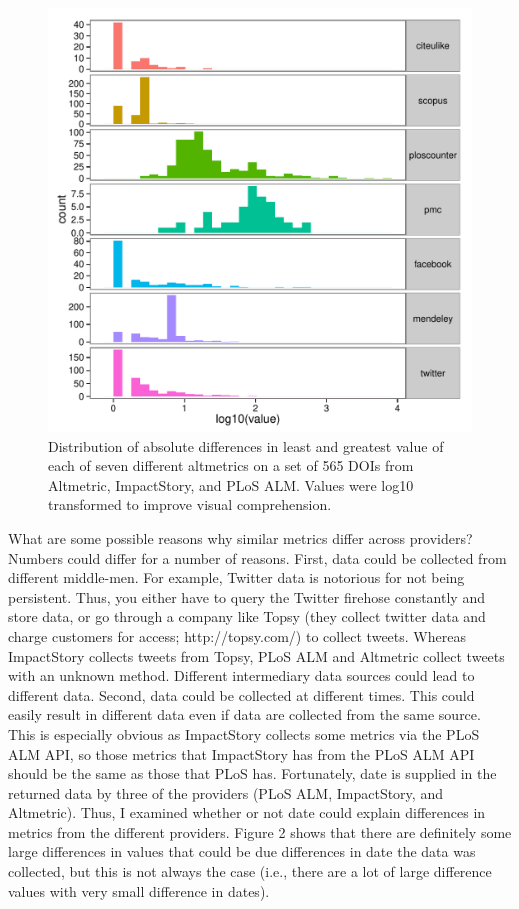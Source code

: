 \documentclass[letterpaper,superscriptaddress,showkeys,longbibliography]{revtex4-1}\usepackage{graphicx, color}
\newenvironment{knitrout}{}{} %
\begin{document}
\begin{knitrout}
\color{fgcolor}\begin{figure}[]


{\centering \includegraphics[width=.7\linewidth]{figure/dataconst_plot1} 

}

\caption[Distribution of absolute differences in least and greatest value of each of seven different altmetrics on a set of 565 DOIs from Altmetric, ImpactStory, and PLoS ALM]{Distribution of absolute differences in least and greatest value of each of seven different altmetrics on a set of 565 DOIs from Altmetric, ImpactStory, and PLoS ALM. Values were log10 transformed to improve visual comprehension.\label{fig:dataconst_plot1}}
\end{figure}


\end{knitrout}


What are some possible reasons why similar metrics differ across providers? Numbers could differ for a number of reasons. First, data could be collected from different middle-men. For example, Twitter data is notorious for not being persistent. Thus, you either have to query the Twitter firehose constantly and store data, or go through a company like Topsy (they collect twitter data and charge customers for access; http://topsy.com/) to collect tweets. Whereas ImpactStory collects tweets from Topsy, PLoS ALM and Altmetric collect tweets with an unknown method. Different intermediary data sources could lead to different data. Second, data could be collected at different times. This could easily result in different data even if data are collected from the same source. This is especially obvious as ImpactStory collects some metrics via the PLoS ALM API, so those metrics that ImpactStory has from the PLoS ALM API should be the same as those that PLoS has. Fortunately, date is supplied in the returned data by three of the providers (PLoS ALM, ImpactStory, and Altmetric). Thus, I examined whether or not date could explain differences in metrics from the different providers. Figure 2 shows that there are definitely some large differences in values that could be due differences in date the data was collected, but this is not always the case (i.e., there are a lot of large difference values with very small difference in dates). 
\end{document}

